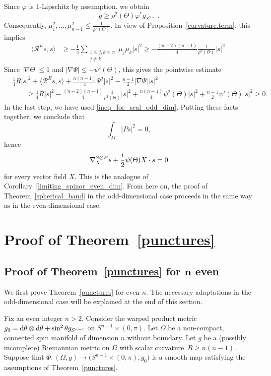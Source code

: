 \documentclass[pdftex]{sigma}
\numberwithin{equation}{section}
\begin{document}
Since $\varphi$ is $1$-Lipschitz by assumption, we obtain
\[
 g \geq \rho^2(\Theta) \varphi^* g_{S^{n-1}} .
 \]
Consequently, $\mu_1^2,\hdots,\mu_{n-1}^2 \leq \frac{1}{\rho^2(\Theta)}$. In view of Proposition~\ref{curvature.term}, this implies
\begin{align*}
\big\langle \mathcal{R}^{E} s,s \big\rangle
&\geq -\frac{1}{4} \sum_{\substack{1 \leq j,k \leq n\\ j \neq k}} \mu_j \mu_k |s|^2 \geq -\frac{(n-2)(n-1)}{4} \frac{1}{\rho^2(\Theta)} |s|^2.
\end{align*}
Since $|\nabla \Theta| \leq 1$ and $|\nabla \Psi| \leq -\psi'(\Theta)$, this gives the pointwise estimate
\begin{align*}
&\frac{1}{4} R |s|^2 + \big\langle \mathcal{R}^{E} s,s \big\rangle + \frac{n(n-1)}{4} \Psi^2 |s|^2 - \frac{n-1}{2} |\nabla \Psi| |s|^2 \\
&\qquad\geq \frac{1}{4} R |s|^2 - \frac{(n-2)(n-1)}{4} \frac{1}{\rho^2(\Theta)} |s|^2
+ \frac{n(n-1)}{4} \psi^2(\Theta) |s|^2 + \frac{n-1}{2} \psi'(\Theta) |s|^2 \geq 0.
\end{align*}
In the last step, we have used \eqref{ineq_for_scal_odd_dim}.
Putting these facts together, we conclude that
\[
\int_M | P s|^2 = 0,
\]
hence
\[
 \nabla_X^{S \otimes E} s + \frac{\rm i}{2} \psi(\Theta) X \cdot s = 0
\]
for every vector field $X$.
This is the analogue of Corollary~\ref{limiting_spinor_even_dim}.
From here on, the proof of Theorem~\ref{spherical_band} in the odd-dimensional case proceeds in the same way as in the even-dimensional case.

\section{Proof of Theorem~\ref{punctures}}
\label{proof_punctures}

\subsection[Proof of Theorem~\ref{punctures} for n even]{Proof of Theorem~\ref{punctures} for $\boldsymbol{n}$ even}

We first prove Theorem~\ref{punctures} for even $n$.
The necessary adaptations in the odd-dimensional case will be explained at the end of this section.

Fix an even integer $n>2$.
Consider the warped product metric $g_0 = {\rm d}\theta \otimes {\rm d}\theta + \sin^2 \theta g_{S^{n-1}}$ on $S^{n-1} \times (0,\pi)$.
Let $\Omega$ be a non-compact, connected spin manifold of dimension $n$ without boundary.
Let $g$ be a (possibly incomplete) Riemannian metric on $\Omega$ with scalar curvature~${R \geq n(n-1)}$.
Suppose that $\Phi\colon (\Omega,g) \to \big(S^{n-1} \times (0,\pi),g_0\big)$ is a smooth map satisfying the assumptions of Theorem~\ref{punctures}.
\end{document}
